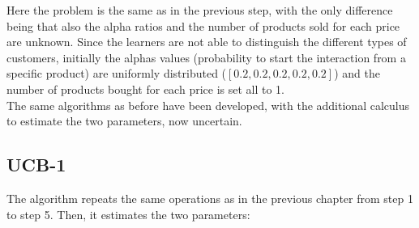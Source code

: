 Here the problem is the same as in the previous step, with the only difference being that also the alpha ratios and the number of products sold for each price are unknown.
Since the learners are not able to distinguish the different types of customers, initially the alphas values (probability to start the interaction from a specific product) are uniformly distributed ($[0.2, 0.2, 0.2, 0.2, 0.2]$) and the number of products bought for each price is set all to 1.\\
The same algorithms as before have been developed, with the additional calculus to estimate the two parameters, now uncertain.

\subsection{UCB-1}
The algorithm repeats the same operations as in the previous chapter from step 1 to step 5. Then, it estimates the two parameters:

